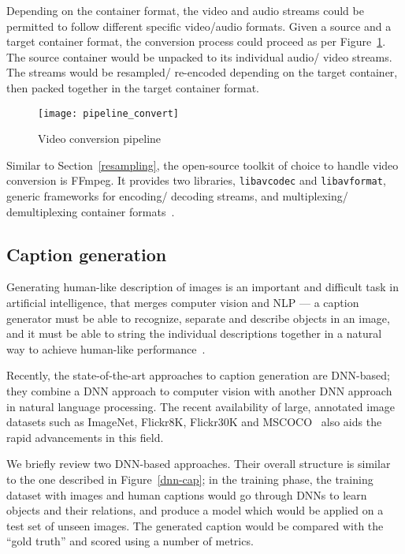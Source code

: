 Depending on the container format, the video and audio streams could be permitted
to follow different specific video/audio formats. Given a source and a target
container format, the conversion process could proceed as per Figure~\ref{convert}.
The source container would be unpacked to its individual audio/ video streams.
The streams would be resampled/ re-encoded depending on the target container, then
packed together in the target container format.

\begin{figure}[ht]
\begin{center}
    \texttt{[image: pipeline\_convert]}
    \caption{Video conversion pipeline}\label{convert}
\end{center}
\end{figure}

Similar to Section~\ref{resampling}, the open-source toolkit of choice to handle
video conversion is FFmpeg. It provides two libraries, \texttt{libavcodec} and
\texttt{libavformat}, generic frameworks for encoding/ decoding streams, and
multiplexing/ demultiplexing container formats~\cite{ffmpeg-libav, ffmpeg-libfmt}.

\subsection{Caption generation}

Generating human-like description of images is an important and difficult task
in artificial intelligence, that merges computer vision and NLP --- a caption
generator must be able to recognize, separate and describe objects in an image,
and it must be able to string the individual descriptions together in a natural
way to achieve human-like performance~\cite{google-img,nrtalk}.

Recently, the state-of-the-art approaches to caption generation are DNN-based;
they combine a DNN approach to computer vision with another DNN approach in
natural language processing. The recent availability of large, annotated
image datasets such as ImageNet, Flickr8K, Flickr30K and MSCOCO~\cite{imagenet,
flickr8k,flickr30k,mscoco} also aids the rapid advancements in this field.

We briefly review two DNN-based approaches. Their overall structure is similar
to the one described in Figure~\ref{dnn-cap}; in the training phase, the training
dataset with images and human captions would go through DNNs to learn objects
and their relations, and produce a model which would be applied on a test set
of unseen images. The generated caption would be compared with the ``gold truth''
and scored using a number of metrics.

